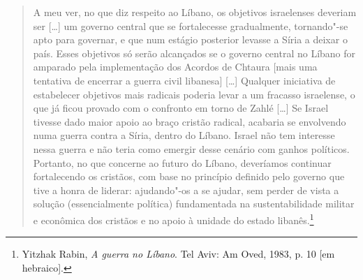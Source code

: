 \begin{quote}
A meu ver, no que diz respeito ao Líbano, os objetivos israelenses
deveriam ser {[}\ldots{}{]} um governo central que se fortalecesse gradualmente,
tornando"-se apto para governar, e que num estágio posterior levasse a Síria
a deixar o país. Esses objetivos só serão alcançados se o governo
central no Líbano for amparado pela implementação dos Acordos de Chtaura
{[}mais uma tentativa de encerrar a guerra civil libanesa{]} {[}\ldots{}{]}
Qualquer iniciativa de estabelecer objetivos mais radicais poderia levar
a um fracasso israelense, o que já ficou provado com o confronto em
torno de Zahlé {[}\ldots{}{]} Se Israel tivesse dado maior apoio ao braço cristão
radical, acabaria se envolvendo numa guerra contra a Síria, dentro do
Líbano. Israel não tem interesse nessa guerra e não teria como emergir
desse cenário com ganhos políticos. Portanto, no que concerne ao futuro
do Líbano, deveríamos continuar fortalecendo os cristãos, com base no
princípio definido pelo governo que tive a honra de liderar: ajudando"-os
a se ajudar, sem perder de vista a solução (essencialmente política)
fundamentada na sustentabilidade militar e econômica dos cristãos e no
apoio à unidade do estado libanês.\footnote{Yitzhak Rabin, \textit{A guerra no
Líbano}. Tel Aviv: Am Oved, 1983, p. 10 {[}em hebraico{]}.}
\end{quote}


